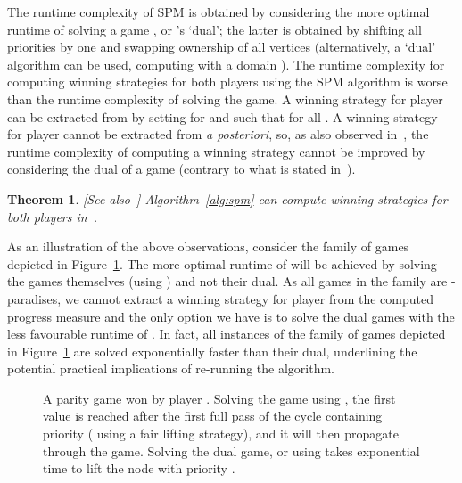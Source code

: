 \documentclass{eptcs}
\newtheorem{theo}{Theorem}
\newenvironment{theorem}{\begin{theo} \rm }{\end{theo}}
\begin{document}
The runtime complexity of SPM is obtained by considering the more optimal
runtime of solving a game , or 's `dual'; the latter is obtained by shifting
all priorities by one and swapping ownership of all vertices (alternatively,
a `dual' algorithm can be used, computing with a domain ). 
The runtime complexity for computing winning strategies for both players using
the SPM algorithm is worse than the runtime complexity of solving the game.  
A winning strategy
 for player  can be extracted
from  by setting  for  and  such that 
for all .  A winning strategy for player 
cannot be extracted from  \emph{a posteriori}, so, as also
observed in~\cite{Sch:07}, the runtime
complexity of computing a winning strategy cannot be improved by
considering the dual of a game (contrary to what is stated in~\cite{Jur:00}). 
\begin{theorem}[See also~\cite{Sch:07}]
Algorithm~\ref{alg:spm} can compute
winning strategies for both players in~. 
\end{theorem}
As an illustration of the above observations, consider the family of games
depicted in Figure~\ref{fig:tops_faster}. The more optimal runtime
of  will be achieved by solving the games themselves
(using ) and not their dual. As all games in the family are
-paradises, we cannot extract a winning strategy for player
 from the computed progress measure and the only option we have is to 
solve the dual games with the less favourable runtime of .
In fact, all instances of the family of games depicted in
Figure~\ref{fig:tops_faster} are solved exponentially faster than
their dual, underlining the potential practical implications of re-running
the algorithm.
\begin{figure}[h]
\centering
{}
\caption{A parity game won by player . Solving the game using
, the first  value is reached after the first full pass
of the cycle containing priority  ( using a fair lifting
strategy), and it will then propagate through the game.
Solving the dual game, or using  takes exponential
time to lift the node with priority .}

\label{fig:tops_faster}
\end{figure}
\end{document}
